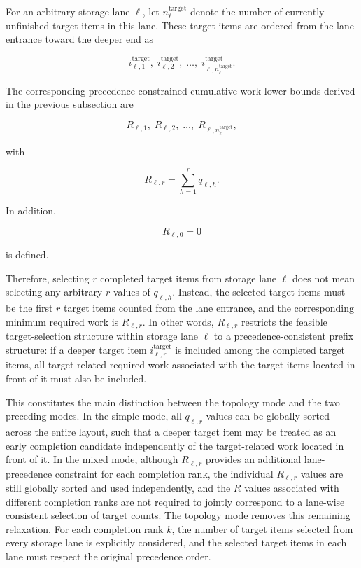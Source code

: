 For an arbitrary storage lane \(\ell\), let
\(n_{\ell}^{\mathrm{target}}\) denote the number of currently unfinished target
items in this lane. These target items are ordered from the lane entrance toward
the deeper end as

\[
i^{\mathrm{target}}_{\ell,1},
\;
i^{\mathrm{target}}_{\ell,2},
\;
\ldots,
\;
i^{\mathrm{target}}_{\ell,n_{\ell}^{\mathrm{target}}}.
\]

The corresponding precedence-constrained cumulative work lower bounds derived
in the previous subsection are

\[
R_{\ell,1},
\;
R_{\ell,2},
\;
\ldots,
\;
R_{\ell,n_{\ell}^{\mathrm{target}}},
\]

with

\[
R_{\ell,r}
=
\sum_{h=1}^{r}
q_{\ell,h}.
\]

In addition,

\[
R_{\ell,0}=0
\]

is defined.

Therefore, selecting \(r\) completed target items from storage lane \(\ell\)
does not mean selecting any arbitrary \(r\) values of \(q_{\ell,h}\). Instead,
the selected target items must be the first \(r\) target items counted from the
lane entrance, and the corresponding minimum required work is
\(R_{\ell,r}\). In other words, \(R_{\ell,r}\) restricts the feasible
target-selection structure within storage lane \(\ell\) to a
precedence-consistent prefix structure: if a deeper target item
\(i^{\mathrm{target}}_{\ell,r}\) is included among the completed target items,
all target-related required work associated with the target items located in
front of it must also be included.

This constitutes the main distinction between the topology mode and the two
preceding modes. In the simple mode, all \(q_{\ell,r}\) values can be globally
sorted across the entire layout, such that a deeper target item may be treated
as an early completion candidate independently of the target-related work
located in front of it. In the mixed mode, although \(R_{\ell,r}\) provides an
additional lane-precedence constraint for each completion rank, the individual
\(R_{\ell,r}\) values are still globally sorted and used independently, and the
\(R\) values associated with different completion ranks are not required to
jointly correspond to a lane-wise consistent selection of target counts. The
topology mode removes this remaining relaxation. For each completion rank
\(k\), the number of target items selected from every storage lane is explicitly
considered, and the selected target items in each lane must respect the original
precedence order.

